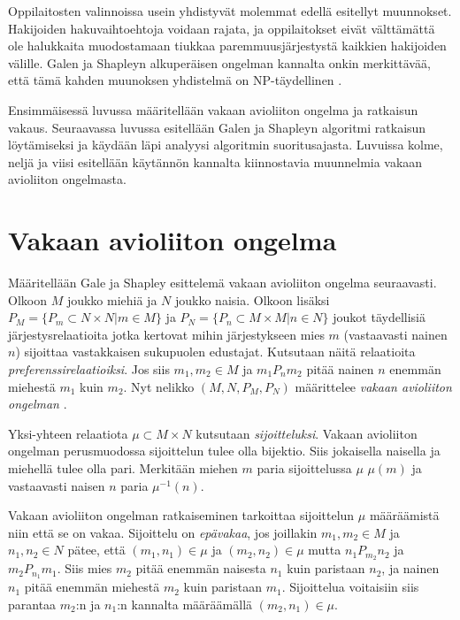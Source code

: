 \documentclass[gradu, twoside]{tktltiki}
\begin{document}
Oppilaitosten valinnoissa usein yhdistyvät molemmat edellä esitellyt
muunnokset. Hakijoiden hakuvaihtoehtoja voidaan rajata, ja
oppilaitokset eivät välttämättä ole halukkaita muodostamaan tiukkaa
paremmuusjärjestystä kaikkien hakijoiden välille. Galen ja Shapleyn
alkuperäisen ongelman kannalta onkin merkittävää, että tämä kahden
muunoksen yhdistelmä on NP-täydellinen \cite{manlove02}.

Ensimmäisessä luvussa määritellään vakaan avioliiton ongelma ja
ratkaisun vakaus. Seuraavassa luvussa esitellään Galen ja Shapleyn
algoritmi ratkaisun löytämiseksi ja käydään läpi analyysi algoritmin
suoritusajasta. Luvuissa kolme, neljä ja viisi esitellään käytännön
kannalta kiinnostavia muunnelmia vakaan avioliiton ongelmasta.

\section{Vakaan avioliiton ongelma}

Määritellään Gale ja Shapley esittelemä \cite{galeshapley62} vakaan
avioliiton ongelma seuraavasti. Olkoon $M$ joukko miehiä ja $N$ joukko
naisia. Olkoon lisäksi $P_M = \{P_m \subset N \times N | m \in M\}$ ja
$P_N = \{P_n \subset M \times M | n \in N\}$ joukot täydellisiä
järjestysrelaatioita jotka kertovat mihin järjestykseen mies $m$
(vastaavasti nainen $n$) sijoittaa vastakkaisen sukupuolen edustajat.
Kutsutaan näitä relaatioita \emph{preferenssirelaatioiksi}. Jos siis
$m_1,m_2 \in M$ ja $m_1P_nm_2$ pitää nainen $n$ enemmän miehestä $m_1$
kuin $m_2$. Nyt nelikko $(M, N, P_M, P_N)$ määrittelee \emph{vakaan
  avioliiton ongelman }.

Yksi-yhteen relaatiota $\mu \subset M \times N$ kutsutaan
\emph{sijoitteluksi}. Vakaan avioliiton ongelman perusmuodossa
sijoittelun tulee olla bijektio. Siis jokaisella naisella ja miehellä
tulee olla pari. Merkitään miehen $m$ paria sijoittelussa $\mu$
$\mu(m)$ ja vastaavasti naisen $n$ paria $\mu^{-1}(n)$.

Vakaan avioliiton ongelman ratkaiseminen tarkoittaa sijoittelun $\mu$
määräämistä niin että se on vakaa. Sijoittelu on \emph{epävakaa}, jos
joillakin $m_1, m_2 \in M$ ja $n_1, n_2 \in N$ pätee, että $(m_1, n_1)
\in \mu$ ja $(m_2, n_2) \in \mu$ mutta $n_1P_{m_2}n_2$ ja
$m_2P_{n_1}m_1$. Siis mies $m_2$ pitää enemmän naisesta $n_1$ kuin
paristaan $n_2$, ja nainen $n_1$ pitää enemmän miehestä $m_2$ kuin
paristaan $m_1$. Sijoittelua voitaisiin siis parantaa $m_2$:n ja
$n_1$:n kannalta määräämällä $(m_2, n_1) \in \mu$.
\end{document}
